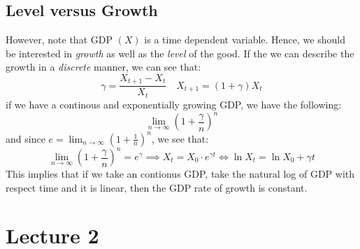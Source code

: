 \documentclass[11pt]{article}
\begin{document}
\subsection{Level versus Growth}
However, note that GDP $(X)$ is a time dependent variable. Hence, we should be interested in \emph{growth} as well as the \emph{level} of the good. If the we can describe the growth in a \emph{discrete} manner, we can see that:
\[
\gamma = \frac{X_{t+1} - X_t}{X_t} \quad X_{t+1} = (1+\gamma)X_t
\]
if we have a continous and exponentially growing GDP, we have the following:
\[
\lim_{n \to \infty} \left( 1 + \frac{\gamma}{n} \right)^n
\]
and since $e = \lim_{n \to \infty} \left( 1 + \frac{1}{n} \right)^n$, we see that:
\[
    \lim_{n \to \infty} \left( 1 + \frac{\gamma}{n} \right)^n = e^\gamma \implies X_t = X_0 \cdot e^{\gamma t} \iff \ln X_t = \ln X_0 + \gamma t
\]
This implies that if we take an contionus GDP, take the natural log of GDP with respect time and it is linear, then the GDP rate of growth is constant. 
\section{Lecture 2}
\end{document}
